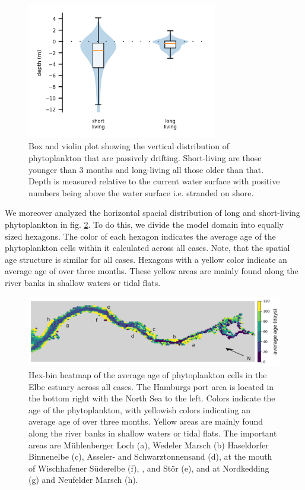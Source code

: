 \documentclass[npg, manuscript]{copernicus}
\begin{document}
\begin{figure}
    \includegraphics[width=8.3cm]{retention_boxplot.png}
    \caption[]{Box and violin plot showing the vertical distribution of phytoplankton that are passively drifting.  Short-living are those younger than 3 months and long-living all those older than that. Depth is measured relative to the current water surface with positive numbers being above the water surface i.e. stranded on shore.}
    \label{fig:migration-long-vs-short}
\end{figure}

We moreover analyzed the horizontal spacial distribution of long and short-living phytoplankton in fig. \ref{fig:migration-long-vs-short-heatmap}.
To do this, we divide the model domain into equally sized hexagons.
The color of each hexagon indicates the average age of the phytoplankton cells within it calculated across all cases.
Note, that the spatial age structure is similar for all cases.
Hexagons with a yellow color indicate an average age of over three months.
These yellow areas are mainly found along the river banks in shallow waters or tidal flats.

\begin{figure}
    \includegraphics[width=12cm]{age_hexbin.png}
    \caption[]{
        Hex-bin heatmap of the average age of phytoplankton cells in the Elbe estuary across all cases.
        The Hamburgs port area is located in the bottom right with the North Sea to the left.
        Colors indicate the age of the phytoplankton, with yellowish colors indicating an average age of over three months.
        Yellow areas are mainly found along the river banks in shallow waters or tidal flats.
        The important areas are Mühlenberger Loch (a), Wedeler Marsch (b) Haseldorfer Binnenelbe (c), Asseler- and Schwarztonnensand (d), at the mouth of Wischhafener Süderelbe (f), , and Stör (e), and at Nordkedding (g) and Neufelder Marsch (h).
    }
    \label{fig:migration-long-vs-short-heatmap}
\end{figure}
\end{document}
